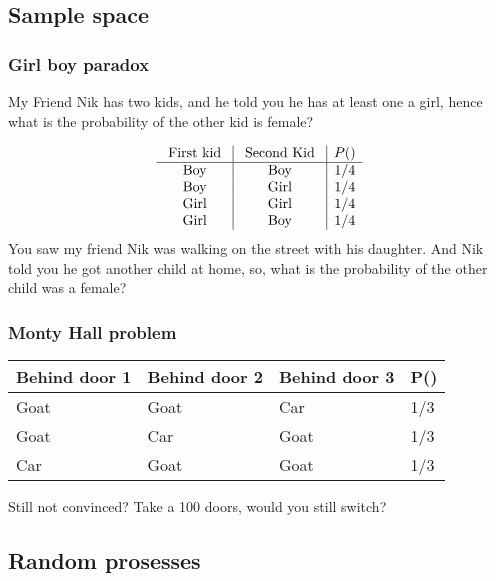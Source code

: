 \documentclass[a4paper,12pt]{article}
\begin{document}
\subsection{Sample space}
\label{sec-1-2}
\subsubsection{Girl boy paradox}
\label{sec-1-2-1}
My Friend Nik has two kids, and he told you he has at least one a girl, hence what is the probability of the other kid is female?

\begin{equation*}
\begin{array}{c|c | c}
{\text { First kid }} & {\text { Second Kid }} &P() \\ 
\hline \text { Boy } & {\text { Boy }} &1/4  \\
 {\text { Boy }} & {\text { Girl }}    &1/4  \\ 
{\text { Girl }} & {\text { Girl }}    &1/4  \\ 
{\text { Girl }} & {\text { Boy }}     &1/4
\end{array}
\end{equation*}
You saw my friend Nik was walking on the street with his daughter. And Nik told you he got another child at home, so, what is the probability of the other child was a female?

\subsubsection{Monty Hall problem}
\label{sec-1-2-2}
\begin{table}[h!]
\centering
\begin{tabular}{l |l |l |l}
Behind door 1 & Behind door 2 & Behind door 3 & P() \\
\hline
Goat          & Goat          & Car           & 1/3 \\
Goat          & Car           & Goat          & 1/3 \\
Car           & Goat          & Goat          & 1/3
\end{tabular}
\end{table}


Still not convinced? Take a 100 doors, would you still switch?


\subsection{Random prosesses}
\label{sec-1-3}
\end{document}
